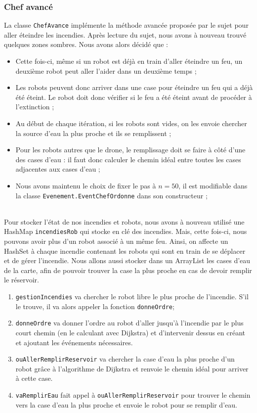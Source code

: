 \documentclass[a4paper,8pt]{article} %
\begin{document}
\subsubsection{Chef avancé}
La classe \texttt{ChefAvance} implémente la méthode avancée proposée par le sujet pour aller éteindre les incendies. Après lecture du sujet, nous avons à nouveau trouvé quelques zones sombres. Nous avons alors décidé que :
\begin{itemize}
    \item Cette fois-ci, même si un robot est déjà en train d'aller éteindre un feu, un deuxième robot peut aller l'aider dans un deuxième temps ;
    \item Les robots peuvent donc arriver dans une case pour éteindre un feu qui a déjà été éteint. Le robot doit donc vérifier si le feu a été éteint avant de procéder à l'extinction ;
    \item Au début de chaque itération, si les robots sont vides, on les envoie chercher la source d'eau la plus proche et ils se remplissent ;
    \item Pour les robots autres que le drone, le remplissage doit se faire à côté d'une des cases d'eau : il faut donc calculer le chemin idéal entre toutes les cases adjacentes aux cases d'eau ;
    \item Nous avons maintenu le choix de fixer le pas à $n=50$, il est modifiable dans la classe \texttt{Evenement.EventChefOrdonne} 
    dans son constructeur ;
\end{itemize} \\

Pour stocker l'état de nos incendies et robots, nous avons à nouveau utilisé une HashMap \texttt{incendiesRob} qui stocke en clé des incendies. Mais, cette fois-ci, nous pouvons avoir plus d'un robot associé à un même feu. Ainsi, on affecte un HashSet à chaque incendie contenant les robots qui sont en train de se déplacer et de gérer l'incendie.
Nous allons aussi stocker dans un ArrayList les cases d'eau de la carte, afin de pouvoir trouver la case la plus proche en cas de devoir remplir le réservoir.

\begin{enumerate}
    \item \texttt{gestionIncendies} va chercher le robot libre le plus proche de l'incendie. S'il le trouve, il va alors appeler la fonction \texttt{donneOrdre};
    \item \texttt{donneOrdre} va donner l'ordre au robot d'aller jusqu'à l'incendie par le plus court chemin (en le calculant avec Dijkstra)
    et d'intervenir dessus en créant et ajoutant les événements nécessaires.
    \item \texttt{ouAllerRemplirReservoir} va chercher la case d'eau la plus proche d'un robot grâce à l'algorithme de Dijkstra et renvoie le chemin idéal pour arriver à cette case.
    \item \texttt{vaRemplirEau} fait appel à \texttt{ouAllerRemplirReservoir} pour trouver le chemin vers la case d'eau la plus proche et envoie le robot pour se remplir d'eau.
\end{enumerate}
\end{document}
